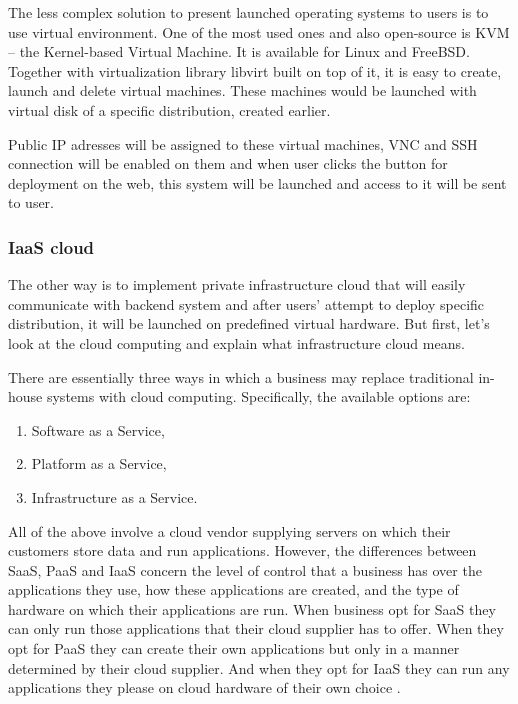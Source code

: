 \documentclass[thesis=B,english]{FITthesis}[2013/04/26]
\begin{document}
The less complex solution to present launched operating systems to users is to use virtual environment. One of the most used ones and also open-source is KVM -- the Kernel-based Virtual Machine. It is available for Linux and FreeBSD. Together with virtualization library libvirt built on top of it, it is easy to create, launch and delete virtual machines. These machines would be launched with virtual disk of a specific distribution, created earlier.

Public IP adresses will be assigned to these virtual machines, VNC and SSH connection will be enabled on them and when user clicks the button for deployment on the web, this system will be launched and access to it will be sent to user.

\subsubsection{IaaS cloud}

The other way is to implement private infrastructure cloud that will easily communicate with backend system and after users' attempt to deploy specific distribution, it will be launched on predefined virtual hardware. But first, let's look at the cloud computing and explain what infrastructure cloud means.

There are essentially three ways in which a business may replace traditional in-house systems with cloud computing. Specifically, the available options are:
\begin{enumerate}
	\item Software as a Service,
	\item Platform as a Service,
	\item Infrastructure as a Service.
\end{enumerate}

All of the above involve a cloud vendor supplying servers on which their customers store data and run applications. However, the differences between SaaS, PaaS and IaaS concern the level of control that a business has over the applications they use, how these applications are created, and the type of hardware on which their applications are run.
When business opt for SaaS they can only run those applications that their cloud supplier has to offer. When they opt for PaaS they can create their own applications but only in a manner determined by their cloud supplier. And when they opt for IaaS they can run any applications they please on cloud hardware of their own choice \cite{cc_guide}.
\end{document}
